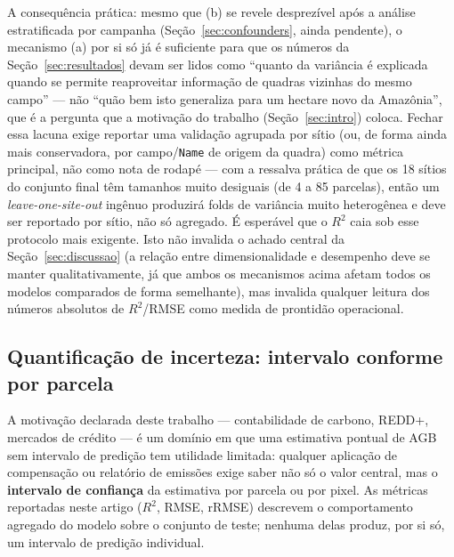 A consequência prática: mesmo que (b) se revele desprezível após a análise
estratificada por campanha (Seção~\ref{sec:confounders}, ainda pendente), o
mecanismo (a) por si só já é suficiente para que os números da
Seção~\ref{sec:resultados} devam ser lidos como ``quanto da variância é explicada
quando se permite reaproveitar informação de quadras vizinhas do mesmo campo'' ---
não ``quão bem isto generaliza para um hectare novo da Amazônia'', que é a pergunta
que a motivação do trabalho (Seção~\ref{sec:intro}) coloca. Fechar essa lacuna
exige reportar uma validação agrupada por sítio (ou, de forma ainda mais
conservadora, por campo/\texttt{Name} de origem da quadra) como métrica principal,
não como nota de rodapé --- com a ressalva prática de que os 18 sítios do conjunto
final têm tamanhos muito desiguais (de 4 a 85 parcelas), então um
\textit{leave-one-site-out} ingênuo produzirá folds de variância muito heterogênea
e deve ser reportado por sítio, não só agregado. É esperável que o $R^2$ caia sob
esse protocolo mais exigente. Isto não invalida o achado central da
Seção~\ref{sec:discussao} (a relação entre dimensionalidade e desempenho deve se
manter qualitativamente, já que ambos os mecanismos acima afetam todos os modelos
comparados de forma semelhante), mas invalida qualquer leitura dos números
absolutos de $R^2$/RMSE como medida de prontidão operacional.

\subsection{Quantificação de incerteza: intervalo conforme por parcela}
\label{sec:conformal}

A motivação declarada deste trabalho --- contabilidade de carbono, REDD+, mercados
de crédito --- é um domínio em que uma estimativa pontual de AGB sem intervalo de
predição tem utilidade limitada: qualquer aplicação de compensação ou relatório de
emissões exige saber não só o valor central, mas o \textbf{intervalo de confiança}
da estimativa por parcela ou por pixel. As métricas reportadas neste artigo
($R^2$, RMSE, rRMSE) descrevem o comportamento agregado do modelo sobre o conjunto
de teste; nenhuma delas produz, por si só, um intervalo de predição individual.

